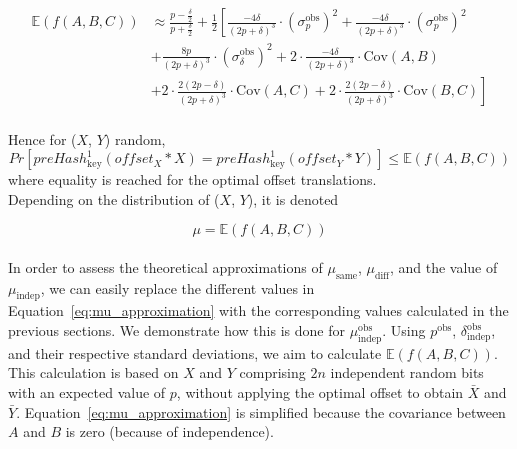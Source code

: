 \begin{equation}
    \begin{aligned}
    \mathbb{E}(f(A,B,C)) &\approx \frac{p - \frac{\delta}{2}}{p + \frac{\delta}{2}} + \frac{1}{2} \left[ \frac{-4\delta}{(2p + \delta)^3}\cdot({\sigma^\text{obs}_p})^2 + \frac{-4\delta}{(2p + \delta)^3}\cdot({\sigma^\text{obs}_p})^2 \right. \\[2mm]
    & \left. + \frac{8p}{(2p + \delta)^3}\cdot({\sigma^\text{obs}_\delta})^2 + 2\cdot\frac{-4\delta}{(2p + \delta)^3}\cdot\text{Cov}(A,B) \right. \\[2mm]
    & \left. + 2\cdot\frac{2(2p - \delta)}{(2p + \delta)^3}\cdot\text{Cov}(A,C) + 2\cdot\frac{2(2p - \delta)}{(2p + \delta)^3}\cdot\text{Cov}(B,C) \right]\\
    \end{aligned}
    \label{eq:mu_approximation}
\end{equation}

Hence for (\(X\), \(Y\)) random,
\begin{equation}
    \label{eq:mu_leq}
    Pr[preHash_{\text{key}}^\text{1}(offset_X * X) = preHash_{\text{key}}^\text{1}(offset_Y * Y)] \leq \mathbb{E}(f(A,B,C))
\end{equation}
where equality is reached for the optimal offset translations.\\

Depending on the distribution of (\(X\), \(Y\)), it is denoted

\begin{equation} \label{eq:mu}
    \mu = \mathbb{E}(f(A,B,C))
\end{equation}\\

In order to assess the theoretical approximations of $\mu_{\text{same}}$, $\mu_{\text{diff}}$, and the value of $\mu_{\text{indep}}$, we can easily replace the different values in Equation~\ref{eq:mu_approximation} with the corresponding values calculated in the previous sections. We demonstrate how this is done for \( \mu_{\text{indep}}^{\text{obs}} \). Using \( p^{\text{obs}} \), \(\delta_{\text{indep}}^{\text{obs}}\), and their respective standard deviations, we aim to calculate \(\mathbb{E}(f(A,B,C))\). This calculation is based on \(X\) and \(Y\) comprising \(2n\) independent random bits with an expected value of \(p\), without applying the optimal offset to obtain \(\bar{X}\) and \(\bar{Y}\). Equation~\ref{eq:mu_approximation} is simplified because the covariance between \(A\) and \(B\) is zero (because of independence).

